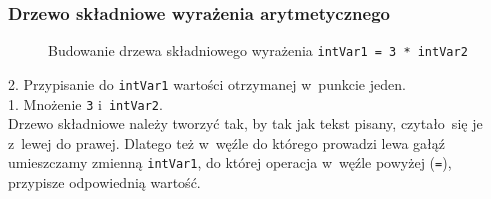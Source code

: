\documentclass[10pt,t]{beamer}
\begin{document}
\begin{frame}
  \frametitle{Drzewo składniowe wyrażenia arytmetycznego}


  \begin{figure}


    \caption{Budowanie drzewa składniowego wyrażenia
      \texttt{intVar1 = 3 * intVar2}}

    \label{fig:Scheme-of-CPU}

  \end{figure}





  2. Przypisanie do \texttt{intVar1} wartości otrzymanej w~punkcie jeden. \\
  1. Mnożenie \texttt{3} i~\texttt{intVar2}. \\
  Drzewo składniowe należy tworzyć tak, by tak jak tekst pisany, czytało~się
  je z~lewej do prawej. Dlatego też w~węźle do którego prowadzi lewa gałąź
  umieszczamy zmienną \texttt{intVar1}, do której operacja w~węźle powyżej
  (\texttt{=}), przypisze odpowiednią wartość.

\end{frame}
\end{document}
